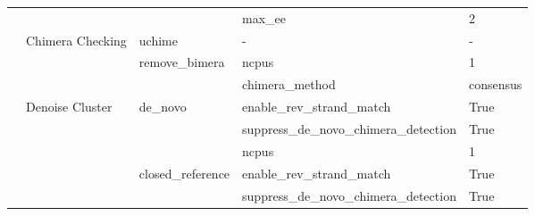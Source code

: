 \begin{table}[]
{\begin{tabular}{|l|l|l|l|l|}
                                          & \multicolumn{1}{c|}{}                                     &                                        & max\_ee                                & 2                                                              \\ \cline{2-5}
                                          & \multirow{3}{*}{Chimera Checking}                         & uchime                                 & -                                      & -                                                              \\ \cline{3-5}
                                          &                                                           & \multirow{2}{*}{remove\_bimera}        & ncpus                                  & 1                                                              \\ \cline{4-5}
                                          &                                                           &                                        & chimera\_method                        & consensus                                                      \\ \cline{2-5}
                                          & \multirow{17}{*}{Denoise Cluster}                         & \multirow{3}{*}{de\_novo}              & enable\_rev\_strand\_match             & True                                                           \\ \cline{4-5}
                                          &                                                           &                                        & suppress\_de\_novo\_chimera\_detection & True                                                           \\ \cline{4-5}
                                          &                                                           &                                        & ncpus                                  & 1                                                              \\ \cline{3-5}
                                          &                                                           & \multirow{4}{*}{closed\_reference}     & enable\_rev\_strand\_match             & True                                                           \\ \cline{4-5}
                                          &                                                           &                                        & suppress\_de\_novo\_chimera\_detection & True                                                           \\ \cline{4-5}

\end{tabular}}
\end{table}
